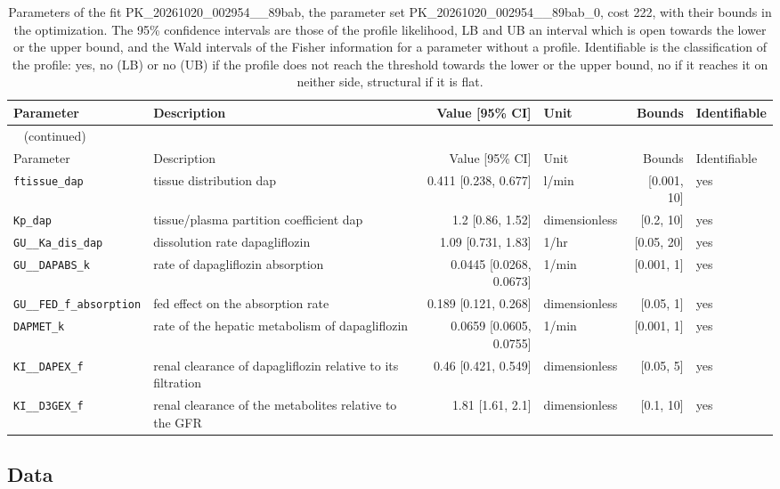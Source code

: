 \begin{longtable}{llrlrl}
\caption{Parameters of the fit PK\_20261020\_002954\_\_89bab, the parameter set PK\_20261020\_002954\_\_89bab\_0, cost 222, with their bounds in the optimization. The 95\% confidence intervals are those of the profile likelihood, LB and UB an interval which is open towards the lower or the upper bound, and the Wald intervals of the Fisher information for a parameter without a profile. Identifiable is the classification of the profile: yes, no (LB) or no (UB) if the profile does not reach the threshold towards the lower or the upper bound, no if it reaches it on neither side, structural if it is flat.}\label{tab:parameters:PK_20261020_002954__89bab} \\
\toprule
Parameter & Description & Value [95\% CI] & Unit & Bounds & Identifiable \\
\midrule
\endfirsthead
\multicolumn{6}{l}{\small\tablename~\thetable{} (continued)} \\
\toprule
Parameter & Description & Value [95\% CI] & Unit & Bounds & Identifiable \\
\midrule
\endhead
\bottomrule
\endlastfoot
\texttt{ftissue\_dap} & tissue distribution dap & 0.411 [0.238, 0.677] & l/min & [0.001, 10] & yes \\
\texttt{Kp\_dap} & tissue/plasma partition coefficient dap & 1.2 [0.86, 1.52] & dimensionless & [0.2, 10] & yes \\
\texttt{GU\_\_Ka\_dis\_dap} & dissolution rate dapagliflozin & 1.09 [0.731, 1.83] & 1/hr & [0.05, 20] & yes \\
\texttt{GU\_\_DAPABS\_k} & rate of dapagliflozin absorption & 0.0445 [0.0268, 0.0673] & 1/min & [0.001, 1] & yes \\
\texttt{GU\_\_FED\_f\_absorption} & fed effect on the absorption rate & 0.189 [0.121, 0.268] & dimensionless & [0.05, 1] & yes \\
\texttt{DAPMET\_k} & rate of the hepatic metabolism of dapagliflozin & 0.0659 [0.0605, 0.0755] & 1/min & [0.001, 1] & yes \\
\texttt{KI\_\_DAPEX\_f} & renal clearance of dapagliflozin relative to its filtration & 0.46 [0.421, 0.549] & dimensionless & [0.05, 5] & yes \\
\texttt{KI\_\_D3GEX\_f} & renal clearance of the metabolites relative to the GFR & 1.81 [1.61, 2.1] & dimensionless & [0.1, 10] & yes \\
\end{longtable}

\subsection{Data}

